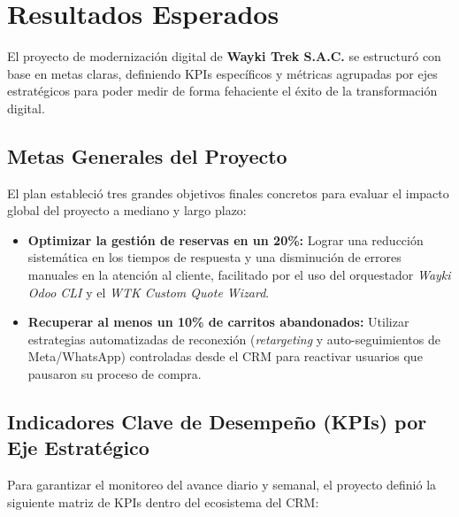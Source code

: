 \section{Resultados Esperados}

El proyecto de modernización digital de \textbf{Wayki Trek S.A.C.} se estructuró con base en metas claras, definiendo KPIs específicos y métricas agrupadas por ejes estratégicos para poder medir de forma fehaciente el éxito de la transformación digital.

\subsection{Metas Generales del Proyecto}
El plan estableció tres grandes objetivos finales concretos para evaluar el impacto global del proyecto a mediano y largo plazo:
\begin{itemize}
    \item \textbf{Optimizar la gestión de reservas en un 20\%:} Lograr una reducción sistemática en los tiempos de respuesta y una disminución de errores manuales en la atención al cliente, facilitado por el uso del orquestador \textit{Wayki Odoo CLI} y el \textit{WTK Custom Quote Wizard}.
    \item \textbf{Recuperar al menos un 10\% de carritos abandonados:} Utilizar estrategias automatizadas de reconexión (\textit{retargeting} y auto-seguimientos de Meta/WhatsApp) controladas desde el CRM para reactivar usuarios que pausaron su proceso de compra.
\end{itemize}

\subsection{Indicadores Clave de Desempeño (KPIs) por Eje Estratégico}
Para garantizar el monitoreo del avance diario y semanal, el proyecto definió la siguiente matriz de KPIs dentro del ecosistema del CRM:

